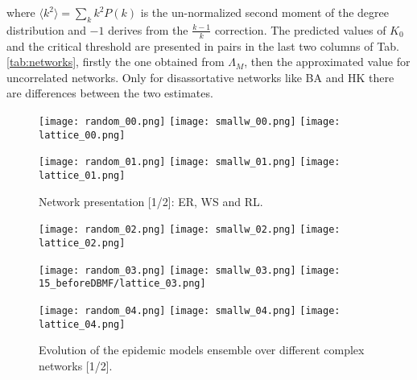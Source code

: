 \documentclass[DIV=12, BCOR=0pt]{scrartcl}  %
\begin{document}
  where $\langle k^2 \rangle = \sum_k k^2 P(k)$ is the un-normalized second moment of the degree distribution and $- 1$ derives from the $\frac{k-1}{k}$ correction.
  The predicted values of $K_0$ and the critical threshold are presented in pairs in the last two columns of Tab. \ref{tab:networks}, firstly the one obtained from $\Lambda_M$, then the approximated value for uncorrelated networks. Only for disassortative networks like BA and HK there are differences between the two estimates. 
 	
  

  \clearpage
  \begin{figure}[h!]
  	\centering
  	\texttt{[image: random\_00.png]}
  	\texttt{[image: smallw\_00.png]}
  	\texttt{[image: lattice\_00.png]}
  	
  	\texttt{[image: random\_01.png]}
  	\texttt{[image: smallw\_01.png]}
  	\texttt{[image: lattice\_01.png]}
  	\caption{Network presentation [1/2]: ER, WS and RL.}
  	\label{fig:networks0}
  \end{figure}  	
  
  \begin{figure}[h!]
  	\centering
  	\texttt{[image: random\_02.png]}
  	\texttt{[image: smallw\_02.png]}
  	\texttt{[image: lattice\_02.png]}
  	
  	\texttt{[image: random\_03.png]}
  	\texttt{[image: smallw\_03.png]}
  	\texttt{[image: 15\_beforeDBMF/lattice\_03.png]}
  	
  	\texttt{[image: random\_04.png]}
  	\texttt{[image: smallw\_04.png]}
  	\texttt{[image: lattice\_04.png]}
  	
  	\caption{Evolution of the epidemic models ensemble over different complex networks [1/2].}
  	\label{fig:outcomes0}
  \end{figure}
  \clearpage

  
\end{document}
